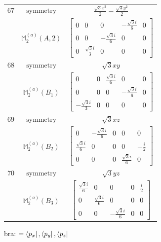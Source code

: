 \documentclass[fleqn,8pt,landscape]{jsarticle}
\begin{document}
\begin{longtable}{ccc}
$ 67 $ & $ \text{symmetry} $ & $ \frac{\sqrt{3} x^{2}}{2} - \frac{\sqrt{3} y^{2}}{2} $ \\
$  $ & $ \mathbb{M}_{2}^{(a)}(A,2) $ & $ \begin{bmatrix} 0 & 0 & 0 & - \frac{\sqrt{3} i}{6} & 0 \\ 0 & 0 & - \frac{\sqrt{3} i}{6} & 0 & 0 \\ 0 & \frac{\sqrt{3} i}{3} & 0 & 0 & 0 \end{bmatrix} $ \\ \hline
$ 68 $ & $ \text{symmetry} $ & $ \sqrt{3} x y $ \\
$  $ & $ \mathbb{M}_{2}^{(a)}(B_{1}) $ & $ \begin{bmatrix} 0 & 0 & \frac{\sqrt{3} i}{6} & 0 & 0 \\ 0 & 0 & 0 & - \frac{\sqrt{3} i}{6} & 0 \\ - \frac{\sqrt{3} i}{3} & 0 & 0 & 0 & 0 \end{bmatrix} $ \\ \hline
$ 69 $ & $ \text{symmetry} $ & $ \sqrt{3} x z $ \\
$  $ & $ \mathbb{M}_{2}^{(a)}(B_{2}) $ & $ \begin{bmatrix} 0 & - \frac{\sqrt{3} i}{6} & 0 & 0 & 0 \\ \frac{\sqrt{3} i}{6} & 0 & 0 & 0 & - \frac{i}{2} \\ 0 & 0 & 0 & \frac{\sqrt{3} i}{6} & 0 \end{bmatrix} $ \\ \hline
$ 70 $ & $ \text{symmetry} $ & $ \sqrt{3} y z $ \\
$  $ & $ \mathbb{M}_{2}^{(a)}(B_{3}) $ & $ \begin{bmatrix} \frac{\sqrt{3} i}{6} & 0 & 0 & 0 & \frac{i}{2} \\ 0 & \frac{\sqrt{3} i}{6} & 0 & 0 & 0 \\ 0 & 0 & - \frac{\sqrt{3} i}{6} & 0 & 0 \end{bmatrix} $ \\ \hline
\end{longtable}
bra: $=\bra{p_{x}}, \bra{p_{y}}, \bra{p_{z}}$
\end{document}
